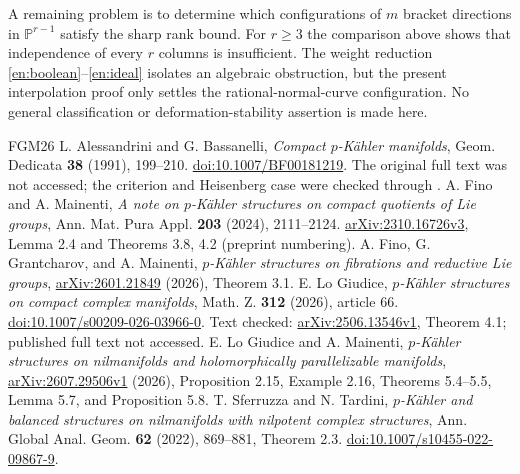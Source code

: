 \documentclass[12pt]{amsart}
\theoremstyle{definition}
\theoremstyle{remark}
\numberwithin{equation}{section}
\newcommand{\langtag}{en}
\begin{document}
A remaining problem is to determine which configurations of $m$ bracket
directions in $\mathbb P^{r-1}$ satisfy the sharp rank bound. For $r\geq3$
the comparison above shows that independence of every $r$ columns is
insufficient. The weight reduction \eqref{en:boolean}--\eqref{en:ideal}
isolates an algebraic obstruction, but the present interpolation proof
only settles the rational-normal-curve configuration. No general
classification or deformation-stability assertion is made here.

\begin{thebibliography}{FGM26}
 L. Alessandrini and G. Bassanelli,
\emph{Compact $p$-K\"ahler manifolds}, Geom. Dedicata \textbf{38} (1991),
199--210. \href{https://doi.org/10.1007/BF00181219}{doi:10.1007/BF00181219}.
The original full text was not accessed; the criterion and Heisenberg
case were checked through \cite[Proposition 2.15 and Example 2.16]{en:LM}.
 A. Fino and A. Mainenti,
\emph{A note on $p$-K\"ahler structures on compact quotients of Lie groups},
Ann. Mat. Pura Appl. \textbf{203} (2024), 2111--2124.
\href{https://arxiv.org/abs/2310.16726v3}{arXiv:2310.16726v3},
Lemma 2.4 and Theorems 3.8, 4.2 (preprint numbering).
 A. Fino, G. Grantcharov, and A. Mainenti,
\emph{$p$-K\"ahler structures on fibrations and reductive Lie groups},
\href{https://arxiv.org/abs/2601.21849}{arXiv:2601.21849} (2026), Theorem 3.1.
 E. Lo Giudice,
\emph{$p$-K\"ahler structures on compact complex manifolds},
Math. Z. \textbf{312} (2026), article 66.
\href{https://doi.org/10.1007/s00209-026-03966-0}{doi:10.1007/s00209-026-03966-0}.
Text checked: \href{https://arxiv.org/abs/2506.13546v1}{arXiv:2506.13546v1},
Theorem 4.1; published full text not accessed.
 E. Lo Giudice and A. Mainenti,
\emph{$p$-K\"ahler structures on nilmanifolds and holomorphically parallelizable manifolds},
\href{https://arxiv.org/abs/2607.29506v1}{arXiv:2607.29506v1} (2026),
Proposition 2.15, Example 2.16, Theorems 5.4--5.5, Lemma 5.7,
and Proposition 5.8.
 T. Sferruzza and N. Tardini,
\emph{$p$-K\"ahler and balanced structures on nilmanifolds with nilpotent complex structures},
Ann. Global Anal. Geom. \textbf{62} (2022), 869--881, Theorem 2.3.
\href{https://doi.org/10.1007/s10455-022-09867-9}{doi:10.1007/s10455-022-09867-9}.
\end{thebibliography}
\newpage
\renewcommand{\langtag}{ja}
\setcounter{section}{0}
\setcounter{thm}{0}
\setcounter{equation}{0}
\setcounter{footnote}{0}
\renewcommand{\theHfootnote}{ja.\arabic{footnote}}
\end{document}
